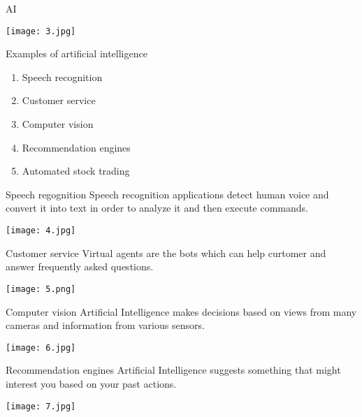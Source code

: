 \documentclass{beamer}
\begin{document}
\begin{frame}{AI}
\begin{center}
\texttt{[image: 3.jpg]}\cite{zdj3}
\end{center}
\end{frame}

\begin{frame}{Examples of artificial intelligence}
\begin{enumerate}
\item Speech recognition
\pause
\item Customer service
\pause
\item Computer vision
\pause
\item Recommendation engines
\pause
\item Automated stock trading
\end{enumerate}
\end{frame}

\begin{frame}{Speech regognition}
Speech recognition applications detect human voice and convert it into text in order to analyze it and then execute commands. 
\pause
\begin{center}
\texttt{[image: 4.jpg]}
\end{center}
\end{frame}

\begin{frame}{Customer service}
Virtual agents are the bots which can help curtomer and answer frequently asked questions. 
\pause
\begin{center}
\texttt{[image: 5.png]}
\end{center}
\end{frame}

\begin{frame}{Computer vision}
Artificial Intelligence makes decisions based on views from many cameras and information from various sensors.
\pause
\begin{center}
\texttt{[image: 6.jpg]}\cite{zdj4}
\end{center}
\end{frame}

\begin{frame}{Recommendation engines}
Artificial Intelligence suggests something that might interest you based on your past actions.
\pause
\begin{center}
\texttt{[image: 7.jpg]}
\end{center}
\end{frame}
\end{document}
